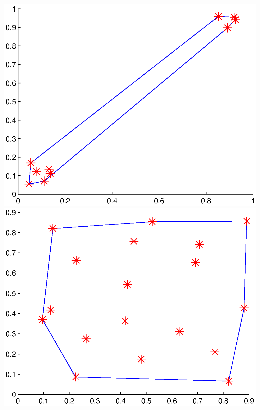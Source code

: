 \documentclass[11pt]{article}
\begin{document}
\includegraphics[scale=0.5]{pict3.eps}
\includegraphics[scale=0.5]{pict4.eps} \newline
\end{document}
